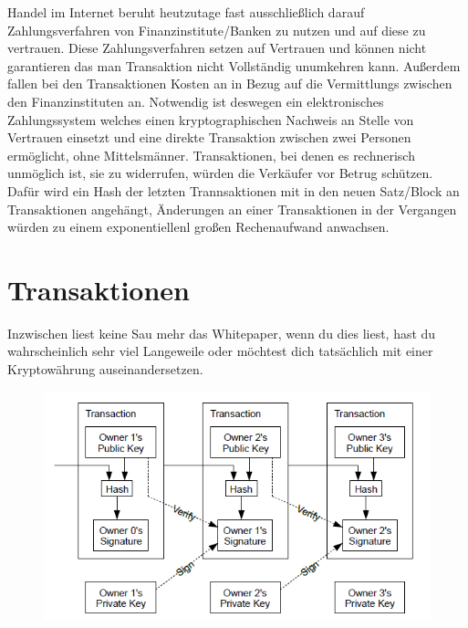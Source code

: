 \documentclass[a4paper, 10pt]{article}
\begin{document}
Handel im Internet beruht heutzutage fast ausschließlich darauf Zahlungsverfahren von Finanzinstitute/Banken zu nutzen und auf diese zu vertrauen. Diese Zahlungsverfahren setzen auf Vertrauen und können nicht garantieren das man Transaktion nicht Vollständig unumkehren kann. Außerdem fallen bei den Transaktionen Kosten an in Bezug auf die Vermittlungs zwischen den Finanzinstituten an. Notwendig ist deswegen ein elektronisches Zahlungssystem welches einen kryptographischen Nachweis an Stelle von Vertrauen einsetzt und eine direkte Transaktion zwischen zwei Personen ermöglicht, ohne Mittelsmänner. Transaktionen, bei denen es rechnerisch unmöglich ist, sie zu widerrufen, würden die Verkäufer vor Betrug schützen. Dafür wird ein Hash der letzten Trannsaktionen mit in den neuen Satz/Block an Transaktionen angehängt, Änderungen an einer Transaktionen in der Vergangen würden zu einem exponentiellenl großen Rechenaufwand anwachsen.

\newpage

\section{Transaktionen}\label{transactions}

Inzwischen liest keine Sau mehr das Whitepaper, wenn du dies liest, hast du wahrscheinlich sehr viel Langeweile oder möchtest dich tatsächlich mit einer Kryptowährung auseinandersetzen. 

\begin{figure}[!h]
\centering
\includegraphics[width=0.75\linewidth]{transactions.png}
\end{figure}
\end{document}
